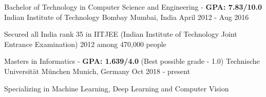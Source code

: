 
\begin{cventries}
  	
  	\cventry
    {Bachelor of Technology in Computer Science and Engineering - \textbf{GPA: 7.83/10.0}} %
    {Indian Institute of Technology Bombay} %
    {Mumbai, India} %
    {April 2012 - Aug 2016} %
    {
		\begin{cvitems}
			\item {Secured all India rank 35 in IITJEE (Indian Institute of Technology Joint Entrance Examination) 2012 among 470,000 people}
		\end{cvitems}
    }
	
	\cventry
	{Masters in Informatics - \textbf{GPA: 1.639/4.0} (Best possible grade - 1.0)} %
	{Technische Universität München} %
	{Munich, Germany} %
	{Oct 2018 - present} %
	{
		\begin{cvitems}
			\item {Specializing in Machine Learning, Deep Learning and Computer Vision}
		\end{cvitems}
	}

\end{cventries}
